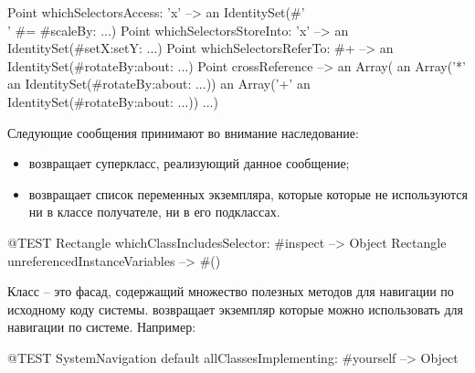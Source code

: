 \documentclass[a4paper,10pt,twoside]{book}
\begin{document}
\begin{code}{} %
Point whichSelectorsAccess: 'x'    --> an IdentitySet(#'\\' #= #scaleBy: ...)
Point whichSelectorsStoreInto: 'x' --> an IdentitySet(#setX:setY: ...)
Point whichSelectorsReferTo: #+  --> an IdentitySet(#rotateBy:about: ...)
Point crossReference --> an Array(
		an Array('*' an IdentitySet(#rotateBy:about: ...))
		an Array('+' an IdentitySet(#rotateBy:about: ...))
		...)
\end{code}

Следующие сообщения принимают во внимание наследование:
\begin{itemize}
\item {} возвращает суперкласс, реализующий данное сообщение;
\item {} возвращает список переменных экземпляра, которые которые не используются ни в классе получателе, ни в его подклассах.
\end{itemize}

\begin{code}{@TEST}
Rectangle whichClassIncludesSelector: #inspect --> Object
Rectangle unreferencedInstanceVariables            --> #()
\end{code}

Класс  -- это фасад, содержащий множество полезных методов для навигации по исходному коду системы.
  возвращает экземпляр которые можно использовать для навигации по системе.
Например:

\begin{code}{@TEST}
SystemNavigation default allClassesImplementing: #yourself --> {Object}
\end{code}
\end{document}

